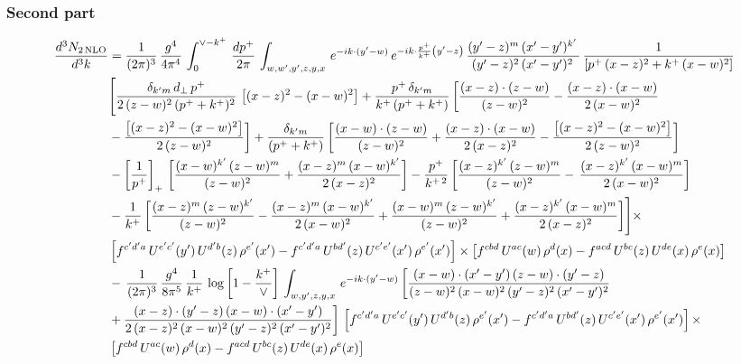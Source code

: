 \documentclass[9pt]{article}
\numberwithin{equation}{section}
\begin{document}
\subsubsection{Second part}
\begin{align}
 \frac{d^{3}N_{2\,\rm NLO}}{d^{3}k} & = \frac{1}{(2\pi)^{3}}\,\frac{g^{4}}{4\pi^{4}}\,\int_{0}^{\vee-k^{+}}\, \frac{dp^{+}}{2\pi}\,\int_{w,w',y',z,y,x}\, e^{-ik\cdot (y'-w)}\,e^{-ik\cdot \frac{p^{+}}{k^{+}}\left(y'-z\right)}\, \frac{(y'-z)^{m}\,(x'-y')^{k'}\,}{(y'-z)^{2}\,(x'-y')^{2}\,}\, \frac{1}{\left[p^{+}\,(x-z)^{2}+k^{+}\,(x-w)^{2}\right]}\notag \\ & \Bigg[\frac{\delta_{k'm}\,d_{\perp}\,p^{+}}{2\,(z-w)^{2}\,(p^{+}+k^{+})^{2}}\, \left[(x-z)^{2}-(x-w)^{2}\right]+\frac{p^{+}\,\delta_{k'm}}{k^{+}\,(p^{+}+k^{+})}\,\bigg[\frac{(x-z)\cdot (z-w)}{(z-w)^{2}} -\frac{(x-z)\cdot (x-w)}{2\,(x-w)^{2}}\notag \\ & -\frac{\left[(x-z)^{2}-(x-w)^{2}\right]}{2\,(z-w)^{2}}\bigg] +\frac{\delta_{k'm}}{(p^{+}+k^{+})}\,\bigg[\frac{(x-w)\cdot (z-w)}{(z-w)^{2}}+\frac{(x-z)\cdot (x-w)}{2\,(x-z)^{2}} -\frac{\left[(x-z)^{2}-(x-w)^{2}\right]}{2\,(z-w)^{2}}\bigg]\notag \\ & -\left[\frac{1}{p^{+}}\right]_{+}\,\bigg[\frac{(x-w)^{k'}\,(z-w)^{m}}{(z-w)^{2}}+\frac{(x-z)^{m}\,(x-w)^{k'}}{2\,(x-z)^{2}}\bigg]-\frac{p^{+}}{k^{+\,2}}\,\bigg[\frac{(x-z)^{k'}\,(z-w)^{m}}{(z-w)^{2}} -\,\frac{(x-z)^{k'}\,(x-w)^{m}}{2\,(x-w)^{2}}\bigg]\notag \\ & -\frac{1}{k^{+}}\,\bigg[\frac{(x-z)^{m}\,(z-w)^{k'}}{(z-w)^{2}}-\frac{(x-z)^{m}\,(x-w)^{k'}}{2\,(x-w)^{2}}+\frac{(x-w)^{m}\,(z-w)^{k'}}{(z-w)^{2}} +\frac{(x-z)^{k'}\,(x-w)^{m}}{2\,(x-z)^{2}}\bigg]\Bigg]\times\,\notag \\ & \left[f^{c'd'a}\,U^{e'c'}(y')\,U^{d'b}(z)\,\rho^{e'}(x')-f^{c'd'a}\, 
    U^{bd'}(z)\,U^{c'e'}(x')\,\rho^{e'}(x')\right]\times \left[f^{cbd}\,U^{ac}(w)\,\rho^{d}(x) -f^{acd}\,U^{bc}(z)\,U^{de}(x)\,\rho^{e}(x)\right]\notag \\ &  -\, \frac{1}{(2\pi)^{3}}\,\frac{g^{4}}{8\pi^{5}}\,\frac{1}{k^{+}}\,\log{\left[1-\frac{k^{+}}{\vee}\right]}\,\int_{w,y',z,y,x}\, e^{-ik\cdot (y'-w)}\,\bigg[\frac{(x-w)\cdot (x'-y')\,(z-w)\cdot (y'-z)}{(z-w)^{2}\,(x-w)^{2}\,(y'-z)^{2}\,(x'-y')^{2}}\notag \\ & +\frac{(x-z)\cdot (y'-z)\,(x-w)\cdot (x'-y')}{2\,(x-z)^{2}\,(x-w)^{2}\,(y'-z)^{2}\,(x'-y')^{2}}\bigg]\, \left[f^{c'd'a}\,U^{e'c'}(y')\,U^{d'b}(z)\,\rho^{e'}(x')-f^{c'd'a}\, 
    U^{bd'}(z)\,U^{c'e'}(x')\,\rho^{e'}(x')\right]\times\notag \\ &  \left[f^{cbd}\,U^{ac}(w)\,\rho^{d}(x) -f^{acd}\,U^{bc}(z)\,U^{de}(x)\,\rho^{e}(x)\right] 
\end{align}
\end{document}
